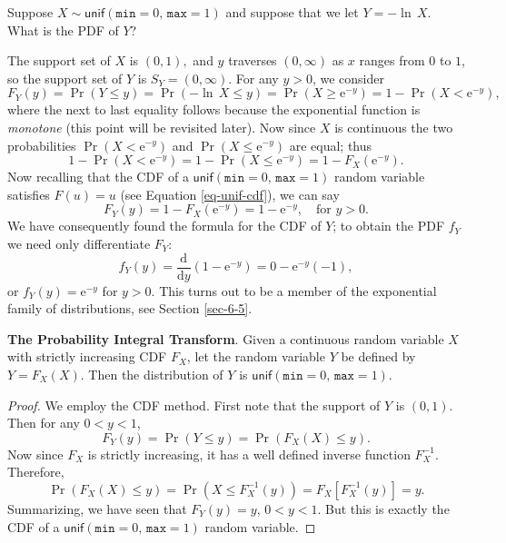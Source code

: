 \documentclass[captions=tableheading]{scrbook}
\begin{document}
\begin{example}
Suppose \(X\sim\mathsf{unif}(\mathtt{min}=0,\,\mathtt{max}=1)\) and
suppose that we let \(Y=-\ln\, X\). What is the PDF of \(Y\)?

The support set of \(X\) is \((0,1),\) and \(y\) traverses \((0,\infty)\) as \(x\) ranges from \(0\) to \(1\), so the support set of \(Y\) is \(S_{Y}=(0,\infty)\). For any \(y>0\), we consider
\[
F_{Y}(y)=\Pr(Y\leq y)=\Pr(-\ln\, X\leq y)=\Pr(X\geq\mathrm{e}^{-y})=1-\Pr(X<\mathrm{e}^{-y}),
\]
where the next to last equality follows because the exponential function is \emph{monotone} (this point will be revisited later). Now since \(X\) is continuous the two probabilities \(\Pr(X<\mathrm{e}^{-y})\) and \(\Pr(X\leq\mathrm{e}^{-y})\) are equal; thus
\[
1-\Pr(X < \mathrm{e}^{-y})=1-\Pr(X\leq\mathrm{e}^{-y})=1-F_{X}(\mathrm{e}^{-y}).
\]
Now recalling that the CDF of a \(\mathsf{unif}(\mathtt{min}=0,\,\mathtt{max}=1)\) random variable satisfies \(F(u)=u\) (see Equation \ref{eq-unif-cdf}), we can say
\[
F_{Y}(y)=1-F_{X}(\mathrm{e}^{-y})=1-\mathrm{e}^{-y},\quad\mbox{for }y>0.
\]
We have consequently found the formula for the CDF of \(Y\); to obtain the PDF \(f_{Y}\) we need only differentiate \(F_{Y}\):
\[
f_{Y}(y)=\frac{\mathrm{d}}{\mathrm{d} y}\left(1-\mathrm{e}^{-y}\right)=0-\mathrm{e}^{-y}(-1),
\]
or \(f_{Y}(y)=\mathrm{e}^{-y}\) for \(y>0\). This turns out to be a member of the exponential family of distributions, see Section \ref{sec-6-5}. 
\end{example}

\begin{example}
\textbf{The Probability Integral Transform}. Given a continuous random variable \(X\) with strictly increasing CDF \(F_{X}\), let the random variable \(Y\) be defined by \(Y=F_{X}(X)\). Then the distribution of \(Y\) is \(\mathsf{unif}(\mathtt{min}=0,\,\mathtt{max}=1)\).
\end{example}

\begin{proof}
We employ the CDF method. First note that the support of \(Y\) is \((0,1)\). Then for any \(0<y<1\),
\[
F_{Y}(y)=\Pr(Y\leq y)=\Pr(F_{X}(X)\leq y).
\]
Now since \(F_{X}\) is strictly increasing, it has a well defined inverse function \(F_{X}^{-1}\). Therefore,
\[
\Pr(F_{X}(X)\leq y)=\Pr(X\leq F_{X}^{-1}(y))=F_{X}[F_{X}^{-1}(y)]=y.
\]
Summarizing, we have seen that \(F_{Y}(y)=y\), \(0<y<1\). But this is exactly the CDF of a \(\mathsf{unif}(\mathtt{min}=0,\,\mathtt{max}=1)\) random variable. 
\end{proof}
\end{document}
